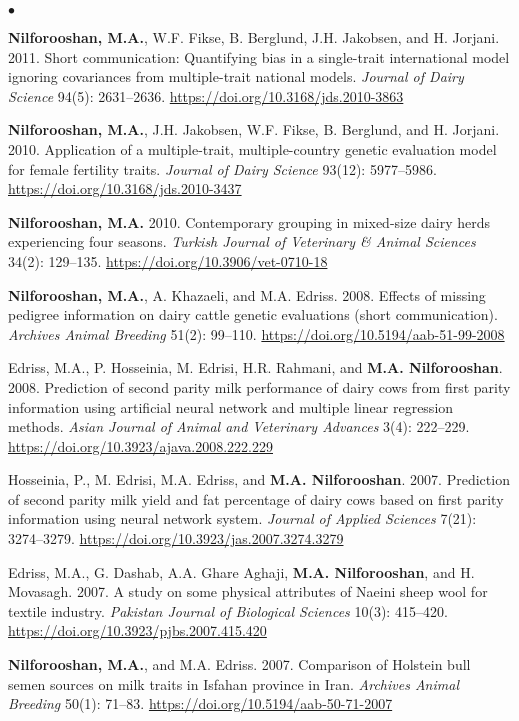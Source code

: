 \documentclass[margin,line]{res}
\newenvironment{list2}{
  \begin{list}{$\bullet$}{%
      \setlength{\itemsep}{0in}
      \setlength{\parsep}{0in} \setlength{\parskip}{0in}
      \setlength{\topsep}{0in} \setlength{\partopsep}{0in}
      \setlength{\leftmargin}{0.2in}}}{\end{list}}
\begin{document}
\begin{resume}
\begin{list2}
    \item {\bf Nilforooshan, M.A.}, W.F. Fikse, B. Berglund, J.H. Jakobsen, and H. Jorjani. 2011. Short communication: Quantifying bias in a single-trait international model ignoring covariances from multiple-trait national models. {\em Journal of Dairy Science} 94(5): 2631--2636. \url{https://doi.org/10.3168/jds.2010-3863}
    \item {\bf Nilforooshan, M.A.}, J.H. Jakobsen, W.F. Fikse, B. Berglund, and H. Jorjani. 2010. Application of a multiple-trait, multiple-country genetic evaluation model for female fertility traits. {\em Journal of Dairy Science} 93(12): 5977--5986. \url{https://doi.org/10.3168/jds.2010-3437}
    \item {\bf Nilforooshan, M.A.} 2010. Contemporary grouping in mixed-size dairy herds experiencing four seasons. {\em Turkish Journal of Veterinary \& Animal Sciences} 34(2): 129--135. \url{https://doi.org/10.3906/vet-0710-18}
    \item {\bf Nilforooshan, M.A.}, A. Khazaeli, and M.A. Edriss. 2008. Effects of missing pedigree information on dairy cattle genetic evaluations (short communication). {\em Archives Animal Breeding} 51(2): 99--110. \url{https://doi.org/10.5194/aab-51-99-2008}
    \item Edriss, M.A., P. Hosseinia, M. Edrisi, H.R. Rahmani, and {\bf M.A. Nilforooshan}. 2008. Prediction of second parity milk performance of dairy cows from first parity information using artificial neural network and multiple linear regression methods. {\em Asian Journal of Animal and Veterinary Advances} 3(4): 222--229. \url{https://doi.org/10.3923/ajava.2008.222.229}
    \item Hosseinia, P., M. Edrisi, M.A. Edriss, and {\bf M.A. Nilforooshan}. 2007. Prediction of second parity milk yield and fat percentage of dairy cows based on first parity information using neural network system. {\em Journal of Applied Sciences} 7(21): 3274--3279. \url{https://doi.org/10.3923/jas.2007.3274.3279}
    \item Edriss, M.A., G. Dashab, A.A. Ghare Aghaji, {\bf M.A. Nilforooshan}, and H. Movasagh. 2007. A study on some physical attributes of Naeini sheep wool for textile industry. {\em Pakistan Journal of Biological Sciences} 10(3): 415--420. \url{https://doi.org/10.3923/pjbs.2007.415.420}
    \item {\bf Nilforooshan, M.A.}, and M.A. Edriss. 2007. Comparison of Holstein bull semen sources on milk traits in Isfahan province in Iran. {\em Archives Animal Breeding} 50(1): 71--83. \url{https://doi.org/10.5194/aab-50-71-2007}

\end{list2}
\end{resume}
\end{document}
